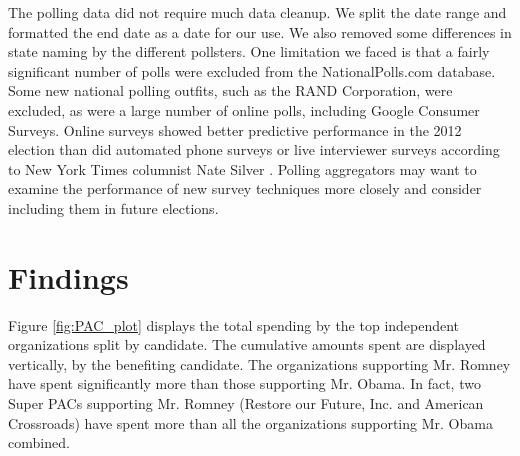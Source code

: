 \documentclass[11pt]{article}\usepackage{graphicx, color}
\begin{document}
The polling data did not require much data cleanup. We split the date range and formatted the end date as a date for our use. We also removed some differences in state naming by the different pollsters. One limitation we faced is that a fairly significant number of polls were excluded from the NationalPolls.com database. Some new national polling outfits, such as the RAND Corporation, were excluded, as were a large number of online polls, including Google Consumer Surveys. Online surveys showed better predictive performance in the 2012 election than did automated phone surveys or live interviewer surveys according to New York Times columnist Nate Silver \cite{ns-polls}. Polling aggregators may want to examine the performance of new survey techniques more closely and consider including them in future elections.


\section{Findings}
% 

Figure \ref{fig:PAC_plot} displays the total spending by the top independent organizations split by candidate. The cumulative amounts spent are displayed vertically, by the benefiting candidate. The organizations supporting Mr. Romney have spent significantly more than those supporting Mr. Obama. In fact, two Super PACs supporting Mr. Romney (Restore our Future, Inc. and American Crossroads) have spent more than all the organizations supporting Mr. Obama combined.
\end{document}
